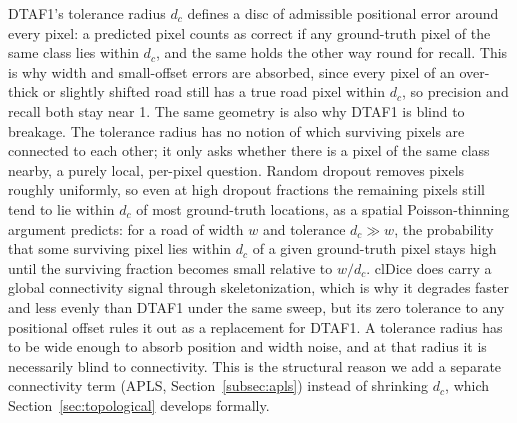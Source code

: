DTAF1's tolerance radius $d_c$ defines a disc of admissible positional error around every pixel: a
predicted pixel counts as correct if any ground-truth pixel of the same class lies within $d_c$,
and the same holds the other way round for recall. This is why width and small-offset errors are
absorbed, since every pixel of an over-thick or slightly shifted road still has a true road pixel
within $d_c$, so precision and recall both stay near 1. The same geometry is also why DTAF1 is
blind to breakage. The tolerance radius has no notion of which surviving pixels are connected to
each other; it only asks whether there is a pixel of the same class nearby, a purely local,
per-pixel question. Random dropout removes pixels roughly uniformly, so even at high dropout
fractions the remaining pixels still tend to lie within $d_c$ of most ground-truth locations, as a
spatial Poisson-thinning argument predicts: for a road of width $w$ and tolerance $d_c \gg w$, the
probability that some surviving pixel lies within $d_c$ of a given ground-truth pixel stays high
until the surviving fraction becomes small relative to $w/d_c$. clDice does carry a global
connectivity signal through skeletonization, which is why it degrades faster and less evenly than
DTAF1 under the same sweep, but its zero tolerance to any positional offset rules it out as a
replacement for DTAF1. A tolerance radius has to be wide enough to absorb position and width noise,
and at that radius it is necessarily blind to connectivity. This is the structural reason we add a
separate connectivity term (APLS, Section~\ref{subsec:apls}) instead of shrinking $d_c$, which
Section~\ref{sec:topological} develops formally.
